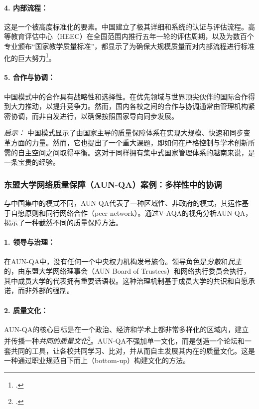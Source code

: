 \paragraph{4. 内部流程：} 这是一个被高度标准化的要素。中国建立了极其详细和系统的认证与评估流程。高等教育评估中心（HEEC）在全国范围内推行五年一轮的评估周期，以及为数百个专业颁布“国家教学质量标准”，都显示了为确保大规模质量而对内部流程进行标准化的巨大努力\footcite{ChinaEQA_HEEC_Standards}。

\paragraph{5. 合作与协调：} 中国模式中的合作具有战略性和选择性。在优先领域与世界顶尖伙伴的国际合作得到大力推动，以提升竞争力。然而，国内各校之间的合作与协调通常由管理机构紧密协调，而非自发进行，以确保按照国家导向同步发展。

\textit{启示：} 中国模式显示了由国家主导的质量保障体系在实现大规模、快速和同步变革方面的力量。然而，它也提出了一个重大课题，即如何在严格控制与学术创新所需的自主空间之间取得平衡。这对于同样拥有集中式国家管理体系的越南来说，是一条宝贵的经验。

\subsubsection{东盟大学网络质量保障（AUN-QA）案例：多样性中的协调}
\label{subsubsec:case_aunqa}
与中国集中的模式不同，AUN-QA代表了一种区域性、非政府的模式，其运作基于自愿原则和同行网络合作（peer network）。通过V-AQA的视角分析AUN-QA，揭示了一种截然不同的质量保障方法。

\paragraph{1. 领导与治理：} 在AUN-QA中，没有任何一个中央权力机构发号施令。领导角色是\textit{分散}和\textit{民主}的，由东盟大学网络理事会（AUN Board of Trustees）和网络执行委员会执行，其中成员大学的代表拥有重要话语权。这种治理机制基于成员大学的共识和自愿承诺，而非外部的强制。

\paragraph{2. 质量文化：} AUN-QA的核心目标是在一个政治、经济和学术上都非常多样化的区域内，建立并传播一种\textit{共同的质量文化}\footcite{AUN-QA_Challenges_VN}。AUN-QA不强加单一文化，而是创造一个论坛和一套共同的工具，让各校共同学习、比对，并从而自主发展其内在的质量文化。这是一种通过职业规范自下而上（bottom-up）构建文化的方法。

